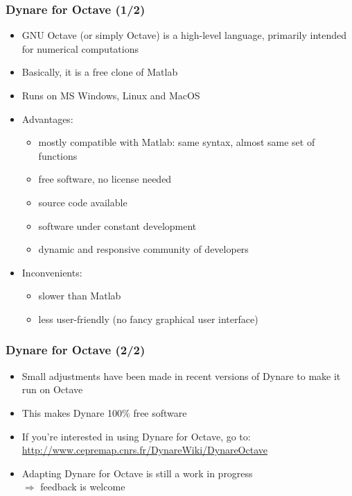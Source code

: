 \documentclass{beamer}
\begin{document}
\begin{frame}
  \frametitle{Dynare for Octave (1/2)}
  \begin{itemize}
  \item GNU Octave (or simply Octave) is a high-level language, primarily intended for numerical computations
  \item Basically, it is a free clone of Matlab
  \item Runs on MS Windows, Linux and MacOS
  \item Advantages:
    \begin{itemize}
    \item mostly compatible with Matlab: same syntax, almost same set of functions
    \item free software, no license needed
    \item source code available
    \item software under constant development
    \item dynamic and responsive community of developers
    \end{itemize}
  \item Inconvenients:
    \begin{itemize}
    \item slower than Matlab
    \item less user-friendly (no fancy graphical user interface)
    \end{itemize}
  \end{itemize}
\end{frame}

\begin{frame}
  \frametitle{Dynare for Octave (2/2)}
  \begin{itemize}
  \item Small adjustments have been made in recent versions of Dynare to make it run on Octave
  \item This makes Dynare 100\% free software
  \item If you're interested in using Dynare for Octave, go to: \\
    \url{http://www.cepremap.cnrs.fr/DynareWiki/DynareOctave}
  \item Adapting Dynare for Octave is still a work in progress \\
    $\Rightarrow$ feedback is welcome
  \end{itemize}
\end{frame}
\end{document}
